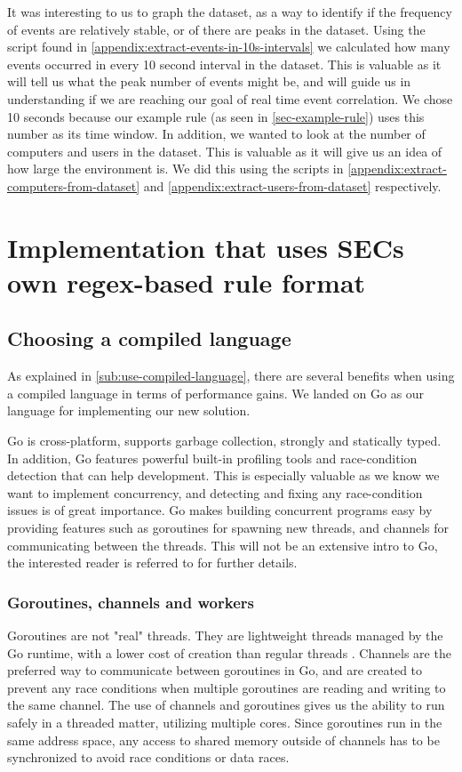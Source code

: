 It was interesting to us to graph the dataset, as a way to identify if the frequency of events are relatively stable, or of there are peaks in the dataset. Using the script found in \cref{appendix:extract-events-in-10s-intervals} we calculated how many events occurred in every 10 second interval in the dataset. This is valuable as it will tell us what the peak number of events might be, and will guide us in understanding if we are reaching our goal of real time event correlation. We chose 10 seconds because our example rule (as seen in \cref{sec-example-rule}) uses this number as its time window.
In addition, we wanted to look at the number of computers and users in the dataset. This is valuable as it will give us an idea of how large the environment is. We did this using the scripts in \cref{appendix:extract-computers-from-dataset} and \cref{appendix:extract-users-from-dataset} respectively.

\section{Implementation that uses SECs own regex-based rule format}
\label{sec:implement-sec}
\subsection{Choosing a compiled language}

As explained in \cref{sub:use-compiled-language}, there are several benefits when using a compiled language in terms of performance gains. We landed on Go as our language for implementing our new solution.

Go \cite{golang} is cross-platform, supports garbage collection, strongly and statically typed. 
In addition, Go features powerful built-in profiling tools and race-condition detection that can help development. This is especially valuable as we know we want to implement concurrency, and detecting and fixing any race-condition issues is of great importance.
Go makes building concurrent programs easy by providing features such as goroutines for spawning new threads, and channels for communicating between the threads.
This will not be an extensive intro to Go, the interested reader is referred to \textcite{golang} for further details.

\subsubsection{Goroutines, channels and workers}
Goroutines are not "real" threads. They are lightweight threads managed by the Go runtime, with a lower cost of creation than regular threads \cite{go-memory-model}.
Channels are the preferred way to communicate between goroutines in Go, and are created to prevent any race conditions when multiple goroutines are reading and writing to the same channel. The use of channels and goroutines gives us the ability to run safely in a threaded matter, utilizing multiple cores. Since goroutines run in the same address space, any access to shared memory outside of channels has to be synchronized to avoid race conditions or data races.

